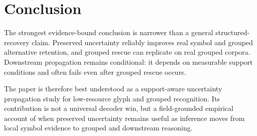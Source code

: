 \section{Conclusion}

The strongest evidence-bound conclusion is narrower than a general structured-recovery claim. Preserved uncertainty reliably improves real symbol and grouped alternative retention, and grouped rescue can replicate on real grouped corpora. Downstream propagation remains conditional: it depends on measurable support conditions and often fails even after grouped rescue occurs.

The paper is therefore best understood as a support-aware uncertainty propagation study for low-resource glyph and grouped recognition. Its contribution is not a universal decoder win, but a field-grounded empirical account of when preserved uncertainty remains useful as inference moves from local symbol evidence to grouped and downstream reasoning.
